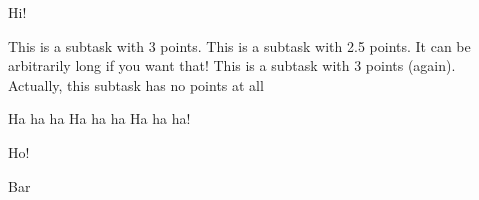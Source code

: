 \documentclass{sp-exam}
\date{12. März 2024}
\begin{document}
   \maketitle

   \makeatletter
   \begin{Exercise}{Hi!}
      \begin{tasks}
          This is a subtask with 3 points.
          This is a subtask with 2.5 points. It can be arbitrarily long if you want that!
         \newpage
          This is a subtask with 3 points (again).
          Actually, this subtask has no points at all
      \end{tasks}
   \end{Exercise}

   \begin{Exercise}[5]{Ha ha ha Ha ha ha Ha ha ha!}
   \end{Exercise}

   \begin{Exercise}{Ho!}
   \end{Exercise}
   \appendix
   Bar
\end{document}
